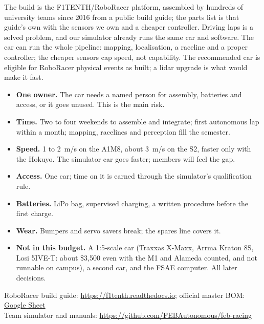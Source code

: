 \documentclass[11pt,a4paper]{article}
\begin{document}
The build is the F1TENTH/RoboRacer platform, assembled by hundreds of university teams since
2016 from a public build guide; the parts list is that guide's own with the sensors we own
and a cheaper controller. Driving laps is a solved problem, and our simulator already runs the same
car and software. The car can run the whole pipeline: mapping, localisation, a raceline and a
proper controller; the cheaper sensors cap speed, not capability. The recommended car is
eligible for RoboRacer physical events as built; a lidar upgrade is what would make it fast.

\begin{itemize}
  \item \textbf{One owner.} The car needs a named person for assembly, batteries and access, or it goes unused. This is the main risk.
  \item \textbf{Time.} Two to four weekends to assemble and integrate; first autonomous lap within a month; mapping, racelines and perception fill the semester.
  \item \textbf{Speed.} 1 to 2~m/s on the A1M8, about 3~m/s on the S2, faster only with the Hokuyo. The simulator car goes faster; members will feel the gap.
  \item \textbf{Access.} One car; time on it is earned through the simulator's qualification rule.
  \item \textbf{Batteries.} LiPo bag, supervised charging, a written procedure before the first charge.
  \item \textbf{Wear.} Bumpers and servo savers break; the spares line covers it.
  \item \textbf{Not in this budget.} A 1:5-scale car (Traxxas X-Maxx, Arrma Kraton 8S, Losi 5IVE-T: about \$3{,}500 even with the M1 and Alameda counted, and not runnable on campus), a second car, and the FSAE computer. All later decisions.
\end{itemize}

\bigskip
\noindent RoboRacer build guide: \url{https://f1tenth.readthedocs.io}; official master BOM: \href{https://docs.google.com/spreadsheets/d/1WT-UdjLTnyrb7CvHcuCxKLnRIN8DWroQ/edit}{Google Sheet}\\
Team simulator and manuals: \url{https://github.com/FEBAutonomous/feb-racing}
\end{document}
